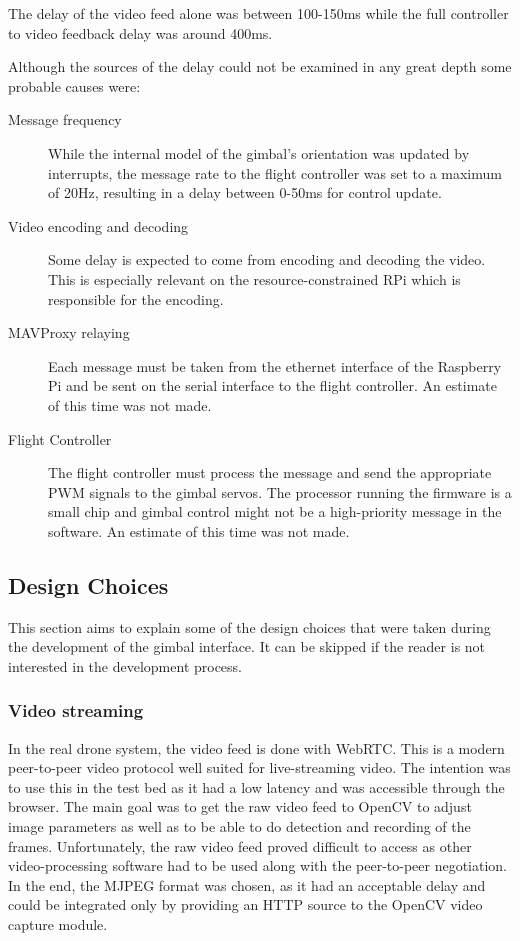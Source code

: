 \documentclass[nofilelist]{cslthse-msc}
\begin{document}
The delay of the video feed alone was between 100-150ms while the full controller to video feedback delay was around 400ms. 

Although the sources of the delay could not be examined in any great depth some probable causes were:
\begin{description}
   \item[Message frequency] 
   While the internal model of the gimbal's orientation was updated by interrupts, the message rate to the flight controller was set to a maximum of 20Hz, resulting in a delay between 0-50ms for control update.
   
   \item [Video encoding and decoding]
   Some delay is expected to come from encoding and decoding the video. This is especially relevant on the resource-constrained RPi which is responsible for the encoding.  

   \item[MAVProxy relaying] Each message must be taken from the ethernet interface of the Raspberry Pi and be sent on the serial interface to the flight controller. An estimate of this time was not made.
   
   \item[Flight Controller] The flight controller must process the message and send the appropriate PWM signals to the gimbal servos. The processor running the firmware is a small chip and gimbal control might not be a high-priority message in the software. An estimate of this time was not made.
\end{description}

\subsection{Design Choices} 
This section aims to explain some of the design choices that were taken during the development of the gimbal interface. It can be skipped if the reader is not interested in the development process.

\subsubsection{Video streaming}
In the real drone system, the video feed is done with WebRTC. This is a modern peer-to-peer video protocol well suited for live-streaming video. The intention was to use this in the test bed as it had a low latency and was accessible through the browser. The main goal was to get the raw video feed to OpenCV to adjust image parameters as well as to be able to do detection and recording of the frames. Unfortunately, the raw video feed proved difficult to access as other video-processing software had to be used along with the peer-to-peer negotiation. In the end, the MJPEG format was chosen, as it had an acceptable delay and could be integrated only by providing an HTTP source to the OpenCV video capture module.
\end{document}
